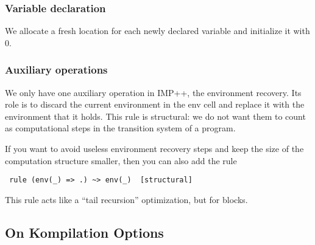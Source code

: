 \documentclass{article}
\begin{document}
\begin{kdefinition}
\begin{module}{}
\begin{kblock}[text]
 \subsubsection{Variable declaration}
We allocate a fresh location for each newly declared variable and
initialize it with 0. \end{kblock}
\begin{kblock}[text]
 \subsubsection{Auxiliary operations}
We only have one auxiliary operation in IMP++, the environment
recovery.  Its role is to discard the current environment in the
\textsf{env} cell and replace it with the environment that it holds.
This rule is structural: we do not want them to count as computational
steps in the transition system of a program. \end{kblock}

\begin{syntaxBlock}{}
\end{syntaxBlock}
\begin{kblock}[text]
 If you want to avoid useless environment recovery steps and keep the size
of the computation structure smaller, then you can also add the rule
\begin{verbatim}
 rule (env(_) => .) ~> env(_)  [structural]
\end{verbatim}
This rule acts like a ``tail recursion'' optimization, but for blocks. \end{kblock}
\end{module}
\begin{kblock}[text]
 \section{On Kompilation Options}


\end{kblock}
\end{kdefinition}
\end{document}
